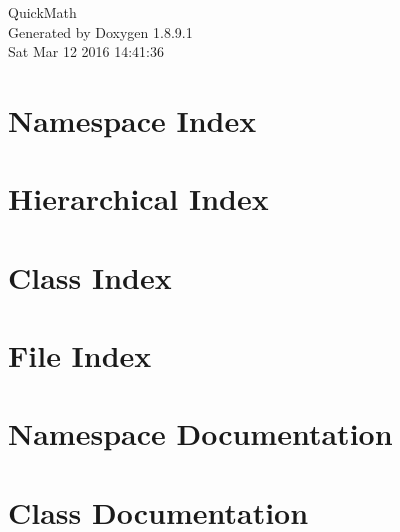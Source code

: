\documentclass[twoside]{book}
\newcommand{\+}{\discretionary{\mbox{\scriptsize$\hookleftarrow$}}{}{}}
\newcommand{\clearemptydoublepage}{%
  \newpage{\pagestyle{empty}\cleardoublepage}%
}
\begin{document}
\hypersetup{pageanchor=false,
             bookmarks=true,
             bookmarksnumbered=true,
             pdfencoding=unicode
            }
\begin{titlepage}
\vspace*{7cm}
\begin{center}%
{\Large Quick\+Math }\\
\vspace*{1cm}
{\large Generated by Doxygen 1.8.9.1}\\
\vspace*{0.5cm}
{\small Sat Mar 12 2016 14:41:36}\\
\end{center}
\end{titlepage}
\clearemptydoublepage
\tableofcontents
\clearemptydoublepage
{}
\hypersetup{pageanchor=true}

\chapter{Namespace Index}

\chapter{Hierarchical Index}

\chapter{Class Index}

\chapter{File Index}

\chapter{Namespace Documentation}


\chapter{Class Documentation}



























\end{document}
